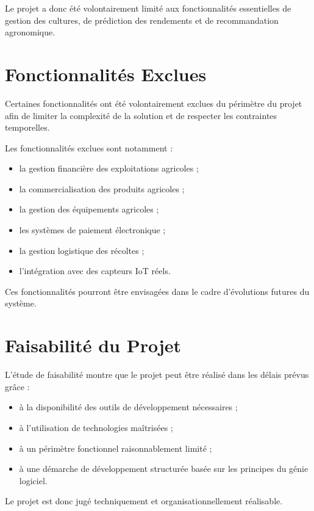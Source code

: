 \documentclass[12pt,a4paper]{report}
\begin{document}
Le projet a donc été volontairement limité aux fonctionnalités
essentielles de gestion des cultures, de prédiction des rendements et de
recommandation agronomique.

\section{Fonctionnalités Exclues}\label{fonctionnalituxe9s-exclues}

Certaines fonctionnalités ont été volontairement exclues du périmètre du
projet afin de limiter la complexité de la solution et de respecter les
contraintes temporelles.

Les fonctionnalités exclues sont notamment :

\begin{itemize}
\item
  la gestion financière des exploitations agricoles ;
\item
  la commercialisation des produits agricoles ;
\item
  la gestion des équipements agricoles ;
\item
  les systèmes de paiement électronique ;
\item
  la gestion logistique des récoltes ;
\item
  l'intégration avec des capteurs IoT réels.
\end{itemize}

Ces fonctionnalités pourront être envisagées dans le cadre d'évolutions
futures du système.

\section{Faisabilité du Projet}\label{faisabilituxe9-du-projet}

L'étude de faisabilité montre que le projet peut être réalisé dans les
délais prévus grâce :

\begin{itemize}
\item
  à la disponibilité des outils de développement nécessaires ;
\item
  à l'utilisation de technologies maîtrisées ;
\item
  à un périmètre fonctionnel raisonnablement limité ;
\item
  à une démarche de développement structurée basée sur les principes du
  génie logiciel.
\end{itemize}

Le projet est donc jugé techniquement et organisationnellement
réalisable.
\end{document}
